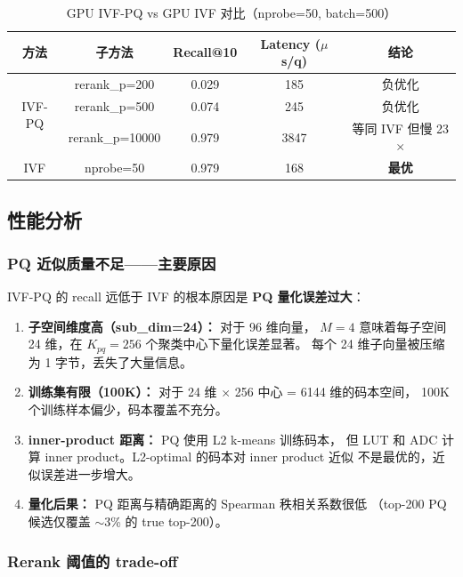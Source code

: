 \documentclass[UTF8,a4paper,10pt]{ctexart}
\begin{document}
\begin{table}[H]
\centering
\caption{GPU IVF-PQ vs GPU IVF 对比（nprobe=50, batch=500）}
\label{tab:ivfpq-vs-ivf}
\begin{tabular}{ccccc}
\toprule
方法 & 子方法 & Recall@10 & Latency ($\mu$s/q) & 结论 \\
\midrule
\multirow{3}{*}{IVF-PQ} & rerank\_p=200 & 0.029 & 185 & 负优化 \\
                        & rerank\_p=500 & 0.074 & 245 & 负优化 \\
                        & rerank\_p=10000 & 0.979 & 3847 & 等同 IVF 但慢 23$\times$ \\
\midrule
IVF & nprobe=50 & 0.979 & 168 & \textbf{最优} \\
\bottomrule
\end{tabular}
\end{table}

\subsection{性能分析}

\subsubsection{PQ 近似质量不足——主要原因}

IVF-PQ 的 recall 远低于 IVF 的根本原因是 \textbf{PQ 量化误差过大}：

\begin{enumerate}[itemsep=0pt]
\item \textbf{子空间维度高（sub\_dim=24）：} 对于 96 维向量，
$M=4$ 意味着每子空间 24 维，在 $K_{pq}=256$ 个聚类中心下量化误差显著。
每个 24 维子向量被压缩为 1 字节，丢失了大量信息。
\item \textbf{训练集有限（100K）：} 对于 24 维 $\times$ 256 中心 = 6144 维的码本空间，
100K 个训练样本偏少，码本覆盖不充分。
\item \textbf{inner-product 距离：} PQ 使用 L2 k-means 训练码本，
但 LUT 和 ADC 计算 inner product。L2-optimal 的码本对 inner product 近似
不是最优的，近似误差进一步增大。
\item \textbf{量化后果：} PQ 距离与精确距离的 Spearman 秩相关系数很低
（top-200 PQ 候选仅覆盖 $\sim$3\% 的 true top-200）。
\end{enumerate}

\subsubsection{Rerank 阈值的 trade-off}
\end{document}
